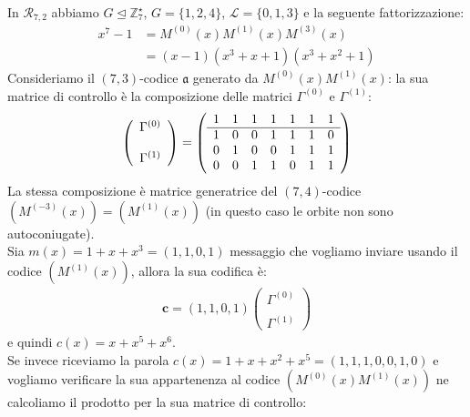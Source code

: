 \begin{esempio} \label{ese:gamma72}
   In $\mathcal{R}_{7,2}$ abbiamo $G \trianglelefteq \mathbb{Z}_{7}^{\star}$, $G = \lbrace 1,2,4 \rbrace$, $\mathscr{L} = \lbrace 0,1,3 \rbrace$ e la seguente fattorizzazione:
   \begin{align*}
      x^{7} - 1 &= M^{(0)}(x) M^{(1)}(x) M^{(3)}(x) \\
		&= (x-1)(x^3 + x + 1)(x^3 + x^2 + 1) 
  \end{align*}
  Consideriamo il $(7,3)$-codice $\mathfrak{a}$ generato da $M^{(0)}(x)M^{(1)}(x)$: la sua matrice di controllo è la composizione delle matrici $\Gamma^{(0)}$ e $\Gamma^{(1)}$:
  \begin{align*}
    \left(
    \begin{array} { c }
    \Gamma^{(0)}  \\ \\
    \Gamma^{(1)} 
    \end{array}
    \right)
    =
    \left(
    \begin{array} { c c c c c c c c}
    1 & 1 & 1 & 1 & 1 & 1 & 1  \\
    \hline
    1 & 0 & 0 & 1 & 1 & 1 & 0  \\
    0 & 1 & 0 & 0 & 1 & 1 & 1  \\
    0 & 0 & 1 & 1 & 0 & 1 & 1  \\
    \end{array}
    \right)
  \end{align*}
  La stessa composizione è matrice generatrice del $(7,4)$-codice $(M^{(-3)}(x)) = (M^{(1)}(x))$ (in questo caso le orbite non sono autoconiugate).\\
  Sia $m(x) = 1 + x + x^3 = (1,1,0,1)$ messaggio che vogliamo inviare usando il codice $(M^{(1)}(x))$, allora la sua codifica è:
    \begin{align*}
    \mathbf{c}
    =
    (1,1,0,1)
    \left(
    \begin{array} { c }
    \Gamma^{(0)}  \\ \\
    \Gamma^{(1)} 
    \end{array}
    \right) 
  \end{align*}
  e quindi $c(x) = x+ x^5 + x^6$. \\
  Se invece riceviamo la parola $c(x) = 1 + x + x^2 + x^5 = (1,1,1,0,0,1,0)$ e vogliamo verificare la sua appartenenza al codice $(M^{(0)}(x)M^{(1)}(x))$ ne calcoliamo il prodotto per la sua matrice di controllo: 
    \begin{align*}

\end{align*}
\end{esempio}
